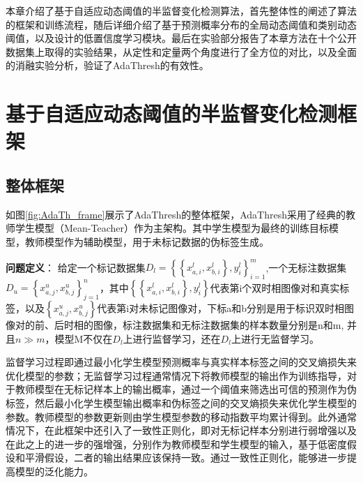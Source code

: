 \documentclass[lang=chs, degree=master, blindreview=false, adobe=false]{yanputhesis}
\begin{document}
本章介绍了基于自适应动态阈值的半监督变化检测算法，首先整体性的阐述了算法的框架和训练流程，随后详细介绍了基于预测概率分布的全局动态阈值和类别动态阈值，以及设计的低置信度学习模块。最后在实验部分报告了本章方法在十个公开数据集上取得的实验结果，从定性和定量两个角度进行了全方位的对比，以及全面的消融实验分析，验证了AdaThresh的有效性。
\section{基于自适应动态阈值的半监督变化检测框架}
\subsection{整体框架}
如图\ref{fig:AdaTh_frame}展示了AdaThresh的整体框架，AdaThresh采用了经典的教师学生模型（Mean-Teacher）作为主架构。其中学生模型为最终的训练目标模型，教师模型作为辅助模型，用于未标记数据的伪标签生成。

\textbf{问题定义}：
给定一个标记数据集$D_{l}=\left\{\left\{x_{a, i}^{l}, x_{b, i}^{l}\right\}, y_{i}^{l}\right\}_{i=1}^{m}$,一个无标注数据集$D_{u}=\left\{x_{a, j}^{u}, x_{b, j}^{u}\right\}_{j=1}^{n}$，其中$\left\{\left\{x_{a, i}^{l}, x_{b, i}^{l}\right\}, y_{i}^{l}\right\}$代表第i个双时相图像对和真实标签，以及$\left\{x_{a, j}^{u}, x_{b, j}^{u}\right\}$代表第i对未标记图像对，下标a和b分别是用于标识双时相图像对的前、后时相的图像，标注数据集和无标注数据集的样本数量分别是n和m, 并且$n \gg m$，模型M不仅在$D_{l}$上进行监督学习，还在$D_{l}$上进行无监督学习。

监督学习过程即通过最小化学生模型预测概率与真实样本标签之间的交叉熵损失来优化模型的参数；无监督学习过程通常情况下将教师模型的输出作为训练指导，对于教师模型在无标记样本上的输出概率，通过一个阈值来筛选出可信的预测作为伪标签，然后最小化学生模型输出概率和伪标签之间的交叉熵损失来优化学生模型的参数。教师模型的参数更新则由学生模型参数的移动指数平均累计得到。此外通常情况下，在此框架中还引入了一致性正则化，即对无标记样本分别进行弱增强以及在此之上的进一步的强增强，分别作为教师模型和学生模型的输入，基于低密度假设和平滑假设，二者的输出结果应该保持一致。通过一致性正则化，能够进一步提高模型的泛化能力。
\end{document}
